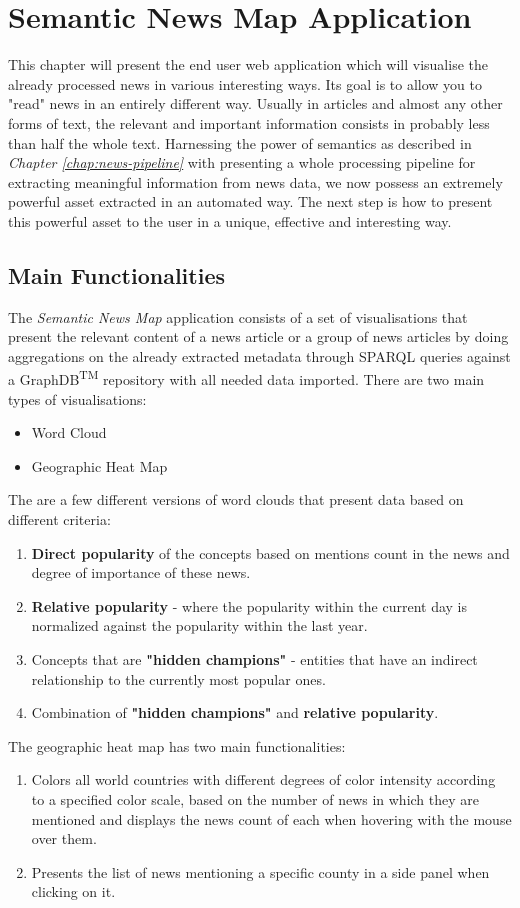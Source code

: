 \chapter{Semantic News Map Application}
\label{chap:semnews-app}

This chapter will present the end user web application which will visualise the already processed news in various interesting ways. Its goal is to allow you to "read" news in an entirely different way. Usually in articles and almost any other forms of text, the relevant and important information consists in probably less than half the whole text. Harnessing the power of semantics as described in \textit{Chapter \ref{chap:news-pipeline}} with presenting a whole processing pipeline for extracting meaningful information from news data, we now possess an extremely powerful asset extracted in an automated way. The next step is how to present this powerful asset to the user in a unique, effective and interesting way. 

\section{Main Functionalities}
The \textit{Semantic News Map} application consists of a set of visualisations that present the relevant content of a news article or a group of news articles by doing aggregations on the already extracted metadata through SPARQL queries against a GraphDB\textsuperscript{TM} repository with all needed data imported. There are two main types of visualisations: 
\begin{itemize}
    \item Word Cloud
    \item Geographic Heat Map
\end{itemize}
The are a few different versions of word clouds that present data based on different criteria:
\begin{enumerate}
    \item \textbf{Direct popularity} of the concepts based on mentions count in the news and degree of importance of these news.
    \item \textbf{Relative popularity} - where the popularity within the current day is normalized against the popularity within the last year.
    \item Concepts that are \textbf{"hidden champions"} - entities that have an indirect relationship to the currently most popular ones.
    \item Combination of \textbf{"hidden champions"} and \textbf{relative popularity}. 
\end{enumerate}
The geographic heat map has two main functionalities:
\begin{enumerate}
    \item Colors all world countries with different degrees of color intensity according to a specified color scale, based on the number of news in which they are mentioned and displays the news count of each when hovering with the mouse over them.
    \item Presents the list of news mentioning a specific county in a side panel when clicking on it.
\end{enumerate}
\newpage

